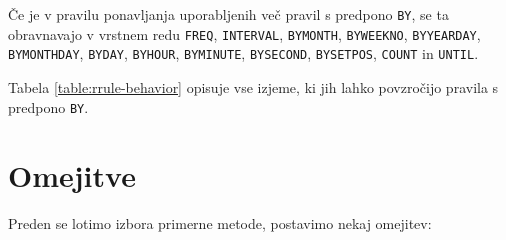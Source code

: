 \begin{table}
\footnotesize
{}
\caption{Razpredelnica izjem pri uporabi pravil za ponavljanje dogodkov. \textbf{Izjema 1:} omeji če je prisotno pravilo \texttt{BYMONTHDAY}, drugače razširi. \textbf{Izjema 2:} omeji za pravili \texttt{BYYEARDAY} in \texttt{BYMONTHDAY}, drugače razširi. }
\label{table:rrule-behavior}
\end{table}

Če je v pravilu ponavljanja uporabljenih več pravil s predpono \texttt{BY}, se ta obravnavajo v vrstnem redu \texttt{FREQ}, \texttt{INTERVAL}, \texttt{BYMONTH}, \texttt{BYWEEKNO}, \texttt{BYYEARDAY}, \texttt{BYMONTHDAY}, \texttt{BYDAY}, \texttt{BYHOUR}, \texttt{BYMINUTE}, \texttt{BYSECOND}, \texttt{BYSETPOS}, \texttt{COUNT} in \texttt{UNTIL}.

Tabela \ref{table:rrule-behavior} opisuje vse izjeme, ki jih lahko povzročijo pravila s predpono \texttt{BY}.

\section{Omejitve}

Preden se lotimo izbora primerne metode, postavimo nekaj omejitev:

